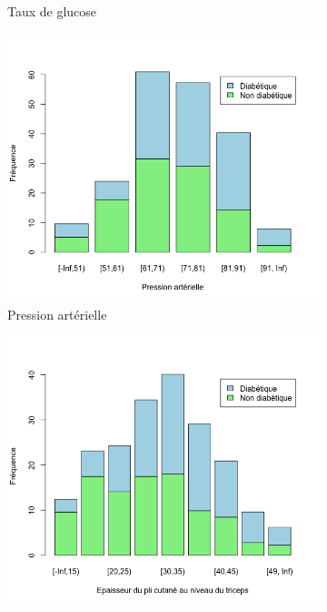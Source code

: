 \documentclass[a4paper,10pt]{report}
\begin{document}
\begin{figure}[H]
\begin{subfigure}[b]{0.25\linewidth}
		\caption{\scriptsize Taux de glucose}
		\label{fig:1-3-2-barplot-freq-diabete-glucose}
	\end{subfigure}%
	\begin{subfigure}[b]{0.25\linewidth}
		\centering
		\captionsetup{justification=centering}
		\includegraphics[width=1\linewidth]{img/1-3-2-barplot-freq-diabete-pression-arterielle}
		\caption{\scriptsize Pression artérielle}
		\label{fig:1-3-2-barplot-freq-diabete-pression-arterielle}
	\end{subfigure}%
	\begin{subfigure}[b]{0.25\linewidth}
		\centering
		\captionsetup{justification=centering}
		\includegraphics[width=1\linewidth]{img/1-3-2-barplot-freq-diabete-pli-cutane}

\end{subfigure}
\end{figure}
\end{document}
